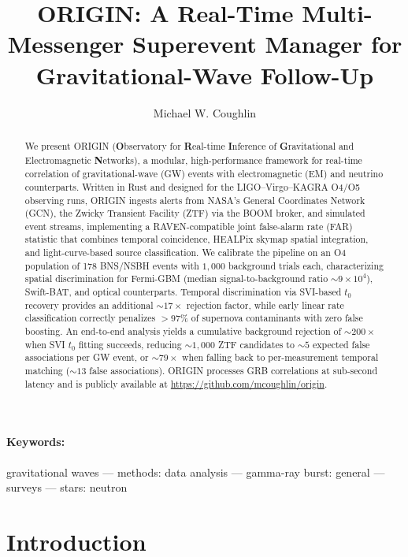 \documentclass[twocolumn]{article}
\begin{document}
\title{ORIGIN: A Real-Time Multi-Messenger Superevent Manager for Gravitational-Wave Follow-Up}

\author{Michael W. Coughlin}
\date{}

\maketitle

\begin{abstract}
We present ORIGIN (\textbf{O}bservatory for \textbf{R}eal-time \textbf{I}nference of \textbf{G}ravitational and Electromagnetic \textbf{N}etworks), a modular, high-performance framework for real-time correlation of gravitational-wave (GW) events with electromagnetic (EM) and neutrino counterparts. Written in Rust and designed for the LIGO--Virgo--KAGRA O4/O5 observing runs, ORIGIN ingests alerts from NASA's General Coordinates Network (GCN), the Zwicky Transient Facility (ZTF) via the BOOM broker, and simulated event streams, implementing a RAVEN-compatible joint false-alarm rate (FAR) statistic that combines temporal coincidence, HEALPix skymap spatial integration, and light-curve-based source classification. We calibrate the pipeline on an O4 population of 178 BNS/NSBH events with $1{,}000$ background trials each, characterizing spatial discrimination for Fermi-GBM (median signal-to-background ratio ${\sim}9\times10^{4}$), Swift-BAT, and optical counterparts. Temporal discrimination via SVI-based $t_0$ recovery provides an additional ${\sim}17\times$ rejection factor, while early linear rate classification correctly penalizes $>97\%$ of supernova contaminants with zero false boosting. An end-to-end analysis yields a cumulative background rejection of ${\sim}200\times$ when SVI $t_0$ fitting succeeds, reducing ${\sim}1{,}000$ ZTF candidates to ${\sim}5$ expected false associations per GW event, or ${\sim}79\times$ when falling back to per-measurement temporal matching (${\sim}13$ false associations). ORIGIN processes GRB correlations at sub-second latency and is publicly available at \url{https://github.com/mcoughlin/origin}.
\end{abstract}

\paragraph{Keywords:} gravitational waves --- methods: data analysis --- gamma-ray burst: general --- surveys --- stars: neutron

\section{Introduction} \label{sec:intro}
\end{document}
